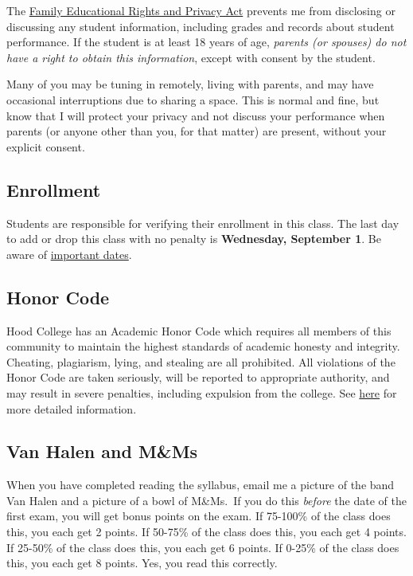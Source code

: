 \documentclass{article}
\begin{document}
The
\href{https://www2.ed.gov/policy/gen/guid/fpco/ferpa/index.html}{Family
Educational Rights and Privacy Act} prevents me from disclosing or
discussing any student information, including grades and records about
student performance. If the student is at least 18 years of age,
\emph{parents (or spouses) do not have a right to obtain this
information}, except with consent by the student.

Many of you may be tuning in remotely, living with parents, and may have
occasional interruptions due to sharing a space. This is normal and
fine, but know that I will protect your privacy and not discuss your
performance when parents (or anyone other than you, for that matter) are
present, without your explicit consent.

\hypertarget{enrollment}{%
\subsection{Enrollment}\label{enrollment}}

Students are responsible for verifying their enrollment in this class.
The last day to add or drop this class with no penalty is
\textbf{Wednesday, September 1}. Be aware of
\href{https://www.hood.edu/offices-services/registrars-office/academic-calendar}{important
dates}.

\hypertarget{honor-code}{%
\subsection{Honor Code}\label{honor-code}}

Hood College has an Academic Honor Code which requires all members of
this community to maintain the highest standards of academic honesty and
integrity. Cheating, plagiarism, lying, and stealing are all prohibited.
All violations of the Honor Code are taken seriously, will be reported
to appropriate authority, and may result in severe penalties, including
expulsion from the college. See
\href{http://hood.smartcatalogiq.com/en/2016-2017/Catalog/The-Spirit-of-Hood/The-Academic-Honor-Code-and-Code-of-Conduct}{here}
for more detailed information.

\hypertarget{van-halen-and-mms}{%
\subsection{Van Halen and M\&Ms}\label{van-halen-and-mms}}

When you have completed reading the syllabus, email me a picture of the
band Van Halen and a picture of a bowl of M\&Ms.~If you do this
\emph{before} the date of the first exam, you will get bonus points on
the exam. If 75-100\% of the class does this, you each get 2 points. If
50-75\% of the class does this, you each get 4 points. If 25-50\% of the
class does this, you each get 6 points. If 0-25\% of the class does
this, you each get 8 points. Yes, you read this correctly.
\end{document}
